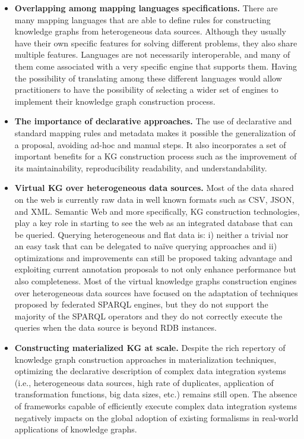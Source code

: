 \begin{itemize}
    \item \textbf{Overlapping among mapping languages specifications.} There are many mapping languages that are able to define rules for constructing knowledge graphs from heterogeneous data sources. Although they usually have their own specific features for solving different problems, they also share multiple features. Languages are not necessarily interoperable, and many of them come associated with a very specific engine that supports them. Having the possibility of translating among these different languages would allow practitioners to have the possibility of selecting a wider set of engines to implement their knowledge graph construction process.
    \item \textbf{The importance of declarative approaches.} The use of declarative and standard mapping rules and metadata makes it possible the generalization of a proposal, avoiding ad-hoc and manual steps. It also incorporates a set of important benefits for a KG construction process such as the improvement of its maintainability, reproducibility readability, and understandability.
    \item \textbf{Virtual KG over heterogeneous data sources.} Most of the data shared on the web is currently raw data in well known formats such as CSV, JSON, and XML. Semantic Web and more specifically, KG construction technologies, play a key role in starting to see the web as an integrated  database that can be queried. Querying heterogeneous and flat data is: i) neither a trivial nor an easy task that can be delegated to na\"ive querying approaches and ii) optimizations and improvements can still be proposed taking advantage and exploiting current annotation proposals to not only enhance performance but also completeness. Most of the virtual knowledge graphs construction engines over heterogeneous data sources have focused on the adaptation of techniques proposed by federated SPARQL engines, but they do not support the majority of the SPARQL operators and they do not correctly execute the queries when the data source is beyond RDB instances.
    \item \textbf{Constructing materialized KG at scale.} Despite the rich repertory of knowledge graph construction approaches in materialization techniques, optimizing the declarative description of complex data integration systems (i.e., heterogeneous data sources, high rate of duplicates, application of transformation functions, big data sizes, etc.) remains still open. The absence of frameworks capable of efficiently execute complex data integration systems negatively impacts on the global adoption of existing formalisms in real-world applications of knowledge graphs.

\end{itemize}
